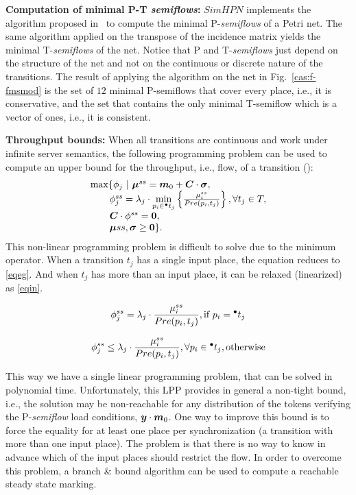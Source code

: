 {\bf Computation of minimal P-T \emph{semiflows}:} $SimHPN$ implements
the algorithm proposed in~\cite{BOSilv85} to compute the minimal P-\emph{semiflows} of a Petri net. The same algorithm applied on the transpose of the incidence matrix yields the minimal T-\emph{semiflows} of the net. Notice that P and T-\emph{semiflows}
just depend on the structure of the net and not on the continuous or discrete
nature of the transitions. The result of applying the algorithm on the net
in Fig.~\ref{cas:f-fmsmod} is the set of  $12$ minimal P-semiflows that
cover every place, i.e., it is conservative, and the set that contains the only
minimal T-semiflow  which is a vector of ones, i.e., it is consistent.


{\bf Throughput bounds:}  When all transitions are continuous and work
under infinite server semantics, the following programming problem can be used to compute an upper bound for the throughput, i.e., flow,  of a transition (\cite{ARJuReSi05}):
\begin{equation}
\begin{array}{l}
\max \{ \phi_j \ |\ \b{\mu}^{ss} = \mo + \b{C} \cdot \b{\sigma}, \\
\ \ \ \ \ \ \phi^{ss}_j = \lambda_j \cdot \min \limits_{p_i \in \preset{t_j}} \left\{ \frac{\mu^{ss}_i}{Pre(p_i,t_j)}  \right\}, \forall t_j \in T, \\
\ \ \ \ \ \ \b{C} \cdot \phi^{ss} = \b{0}, \\
\ \ \ \ \ \ \b{\mu}{ss}, \b{\sigma} \geq \b{0} \}.
\end{array}
\end{equation}
This non-linear programming problem is difficult to solve due to the minimum operator. When a transition $t_j$ has a single input place, the equation reduces to \eqref{eqeg}. And when $t_j$ has more than an input place, it can be relaxed (linearized) as \eqref{eqin}.

\begin{equation}
\label{eqeg}
\phi^{ss}_j = \lambda_j \cdot \frac{\mu^{ss}_i}{Pre(p_i,t_j)}, \mbox{if\ } p_i=\preset{t_j}
\end{equation}

\begin{equation}
\label{eqin}
\phi^{ss}_j \leq \lambda_j \cdot \frac{\mu^{ss}_i}{Pre(p_i,t_j)}, \forall p_i \in \,\!^\bullet{t_j}, \mbox{otherwise}
\end{equation}

This way we have a single linear programming problem, that can be solved in polynomial time.
Unfortunately, this LPP provides in general a non-tight bound, i.e., the solution may be non-reachable for any distribution of the tokens verifying the P-\emph{semiflow} load conditions, $\b{y} \cdot \mo$. One way to improve this bound is to force the equality for at least one place per synchronization (a transition with more than one input place). The problem is that there is no way to know in advance which of the input places should restrict the flow. In order to overcome this problem, a branch \& bound algorithm can be used to compute a reachable steady state marking.


